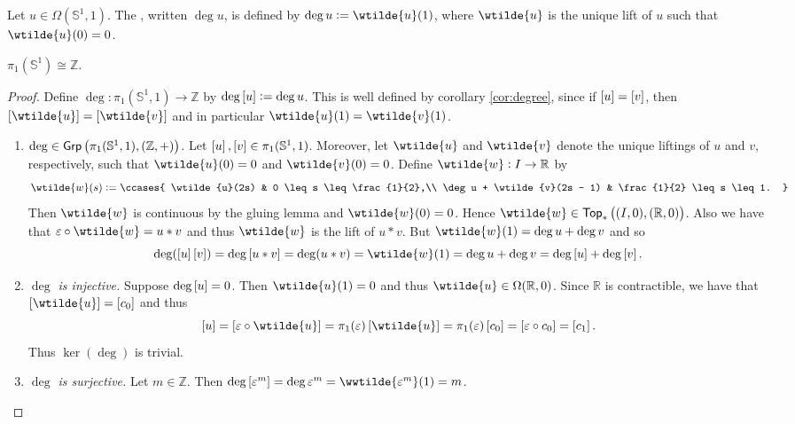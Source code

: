 \begin{definition}[Degree]
	Let $u \in \Omega(\mathbb{S}^1,1)$. The , written $\deg u$, is defined by $\deg u := \wtilde{u}(1)$, where $\wtilde{u}$ is the unique lift of $u$ such that $\wtilde{u}(0) = 0$. 
\end{definition}

\begin{theorem}
	$\pi_1(\mathbb{S}^1) \cong \mathbb{Z}$.
\end{theorem}

\begin{proof}
	Define $\deg : \pi_1(\mathbb{S}^1,1) \to \mathbb{Z}$ by $\deg \sbr{u} := \deg u$. This is well defined by corollary \ref{cor:degree}, since if $\sbr{u} = \sbr{v}$, then $\sbr[0]{\wtilde{u}} = \sbr[0]{\wtilde{v}}$ and in particular $\wtilde{u}(1) = \wtilde{v}(1)$. 
	\begin{enumerate}[label = \textit{Step \arabic*:},wide = 0pt]
		\item \textit{$\deg \in \mathsf{Grp}\del[1]{\pi_1(\mathbb{S}^1,1),(\mathbb{Z},+)}$.} Let $\sbr{u},\sbr{v} \in \pi_1(\mathbb{S}^1,1)$. Moreover, let $\wtilde{u}$ and $\wtilde{v}$ denote the unique liftings of $u$ and $v$, respectively, such that $\wtilde{u}(0) = 0$ and $\wtilde{v}(0) = 0$. Define $\wtilde{w} : I \to \mathbb{R}$ by
			\begin{equation*}
				\wtilde{w}(s) := \ccases{
				\wtilde{u}(2s) & 0 \leq s \leq \frac{1}{2},\\
				\deg u + \wtilde{v}(2s - 1) & \frac{1}{2} \leq s \leq 1.
			}
			\end{equation*}
			Then $\wtilde{w}$ is continuous by the gluing lemma and $\wtilde{w}(0) = 0$. Hence $\wtilde{w} \in \mathsf{Top}_\ast\del[1]{(I,0),(\mathbb{R},0)}$. Also we have that $\varepsilon \circ \wtilde{w} = u \ast v$ and thus $\wtilde{w}$ is the lift of $u \ast v$. But $\wtilde{w}(1) = \deg u + \deg v$ and so
			\begin{equation*}
				\deg(\sbr{u}\sbr{v}) = \deg\sbr{u\ast v} = \deg (u \ast v) = \wtilde{w}(1) = \deg u + \deg v = \deg\sbr{u} + \deg \sbr{v}.
			\end{equation*}
		\item \textit{$\deg$ is injective.} Suppose $\deg\sbr{u} = 0$. Then $\wtilde{u}(1) = 0$ and thus $\wtilde{u} \in \Omega(\mathbb{R},0)$. Since $\mathbb{R}$ is contractible, we have that $\sbr[0]{\wtilde{u}} = \sbr{c_0}$ and thus
			\begin{equation*}
				\sbr{u} = \sbr[0]{\varepsilon \circ \wtilde{u}} = \pi_1(\varepsilon)\sbr[0]{\wtilde{u}} = \pi_1(\varepsilon)\sbr{c_0} = \sbr{\varepsilon \circ c_0} = \sbr{c_1}.
			\end{equation*}
			Thus $\ker(\deg)$ is trivial.
		\item \textit{$\deg$ is surjective.} Let $m \in \mathbb{Z}$. Then $\deg\sbr[0]{\varepsilon^m} = \deg \varepsilon^m = \wwtilde{\varepsilon^m}(1) = m$.
	\end{enumerate}
\end{proof}

